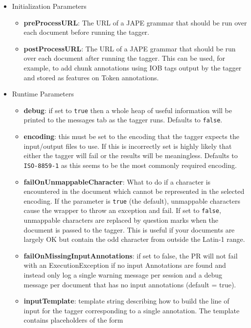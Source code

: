 \begin{itemize}
\item{Initialization Parameters}
   \begin{itemize}
      \item \textbf{preProcessURL}: The URL of a JAPE grammar that should be run over each document before
         running the tagger.
      \item \textbf{postProcessURL}: The URL of a JAPE grammar that should be run over each document after
         running the tagger. This can be used, for example, to add chunk annotations using IOB
         tags output by the tagger and stored as features on Token annotations.
   \end{itemize}
\item{Runtime Parameters}
   \begin{itemize}
      \item \textbf{debug}: if set to \texttt{true} then a whole heap of useful information will be printed to the
         messages tab as the tagger runs. Defaults to \texttt{false}.
      \item \textbf{encoding}: this must be set to the encoding that the tagger expects the input/output files
         to use. If this is incorrectly set is highly likely that either the tagger will fail or
         the results will be meaningless. Defaults to \texttt{ISO-8859-1} as this seems to be the most
         commonly required encoding.
      \item \textbf{failOnUnmappableCharacter}: What to do if a character is encountered in the document which
         cannot be represented in the selected encoding.  If the parameter is \texttt{true} (the default),
         unmappable characters cause the wrapper to throw an exception and fail.  If set to \texttt{false},
         unmappable characters are replaced by question marks when the document is passed to the tagger.
         This is useful if your documents are largely OK but contain the odd character from outside the
         Latin-1 range.
       \item \textbf{failOnMissingInputAnnotations}: if set to false, the PR
         will not fail with an ExecutionException if no input Annotations are
         found and instead only log a single warning message per session and a
         debug message per document that has no input annotations (default =
         true).
      \item \textbf{inputTemplate}: template string describing how to build the line of input for the tagger
         corresponding to a single annotation.  The template contains placeholders of the form

\end{itemize}
\end{itemize}

